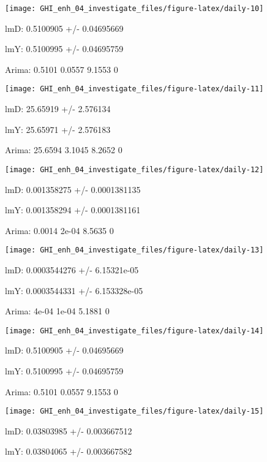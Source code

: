 \documentclass[
  10pt,
  a4paper,oneside]{article}
\begin{document}
\begin{center}\texttt{[image: GHI\_enh\_04\_investigate\_files/figure-latex/daily-10]} \end{center}

lmD: 0.5100905 +/- 0.04695669

lmY: 0.5100995 +/- 0.04695759

Arima: 0.5101 0.0557 9.1553 0

\begin{center}\texttt{[image: GHI\_enh\_04\_investigate\_files/figure-latex/daily-11]} \end{center}

lmD: 25.65919 +/- 2.576134

lmY: 25.65971 +/- 2.576183

Arima: 25.6594 3.1045 8.2652 0

\begin{center}\texttt{[image: GHI\_enh\_04\_investigate\_files/figure-latex/daily-12]} \end{center}

lmD: 0.001358275 +/- 0.0001381135

lmY: 0.001358294 +/- 0.0001381161

Arima: 0.0014 2e-04 8.5635 0

\begin{center}\texttt{[image: GHI\_enh\_04\_investigate\_files/figure-latex/daily-13]} \end{center}

lmD: 0.0003544276 +/- 6.15321e-05

lmY: 0.0003544331 +/- 6.153328e-05

Arima: 4e-04 1e-04 5.1881 0

\begin{center}\texttt{[image: GHI\_enh\_04\_investigate\_files/figure-latex/daily-14]} \end{center}

lmD: 0.5100905 +/- 0.04695669

lmY: 0.5100995 +/- 0.04695759

Arima: 0.5101 0.0557 9.1553 0

\begin{center}\texttt{[image: GHI\_enh\_04\_investigate\_files/figure-latex/daily-15]} \end{center}

lmD: 0.03803985 +/- 0.003667512

lmY: 0.03804065 +/- 0.003667582
\end{document}
